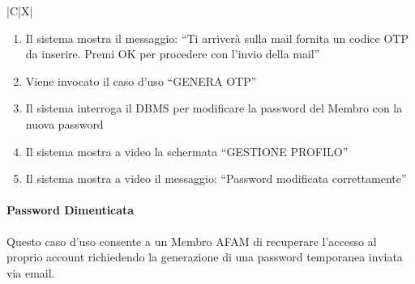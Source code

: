 \begin{tabularx}{\textwidth}{|C|X|}
{\begin{enumerate}
\begin{enumerate}
\begin{enumerate}
            \item Il Membro clicca il pulsante ``CONFERMA''
        \end{enumerate}
        \item \textbf{ALTRIMENTI SE} il campo della nuova password non \`e uguale al suo campo di conferma:
        \begin{enumerate}
            \item Il sistema mostra a video l'errore: ``Errore: I campi ``NUOVA PASSWORD'' e ``CONFERMA NUOVA PASSWORD'' devono essere uguali!''
            \item Il Membro ricompila i campi
            \item Il Membro clicca il pulsante ``CONFERMA''
        \end{enumerate}
        \item Il sistema controlla i valori inseriti
    \end{enumerate}
    \item Il sistema mostra il messaggio: ``Ti arriver\`a sulla mail fornita un codice OTP da inserire. Premi OK per procedere con l'invio della mail''
    \item Viene invocato il caso d'uso ``GENERA OTP''
    \item Il sistema interroga il DBMS per modificare la password del Membro con la nuova password
    \item Il sistema mostra a video la schermata ``GESTIONE PROFILO''
    \item Il sistema mostra a video il messaggio: ``Password modificata correttamente''
\end{enumerate}
}
\hline
\end{tabularx}

\clearpage

\paragraph{Password Dimenticata}
\par{\noindent Questo caso d'uso consente a un Membro AFAM di recuperare l'accesso al proprio account richiedendo la generazione di una password temporanea inviata via email.}

